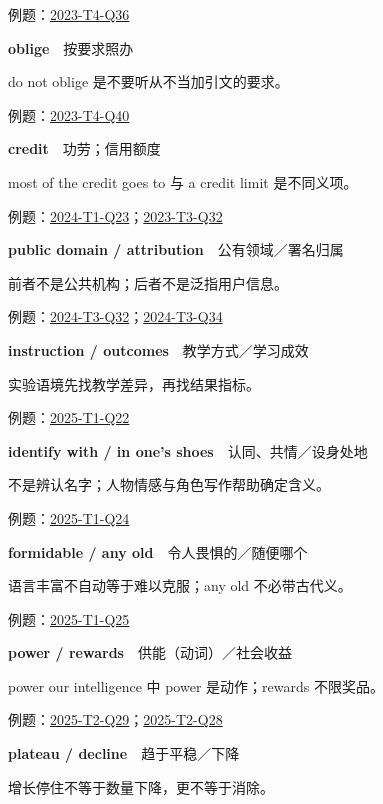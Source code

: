 \documentclass[11pt,a4paper]{article}
\begin{document}
\noindent\small 例题：\hyperref[idx-2023-T4-Q36]{2023-T4-Q36}\normalsize\par\medskip
{}\noindent\textbf{oblige}　按要求照办\par\nopagebreak
do not oblige 是不要听从不当加引文的要求。

\noindent\small 例题：\hyperref[idx-2023-T4-Q40]{2023-T4-Q40}\normalsize\par\medskip
{}\noindent\textbf{credit}　功劳；信用额度\par\nopagebreak
most of the credit goes to 与 a credit limit 是不同义项。

\noindent\small 例题：\hyperref[idx-2024-T1-Q23]{2024-T1-Q23}；\hyperref[idx-2023-T3-Q32]{2023-T3-Q32}\normalsize\par\medskip
{}\noindent\textbf{public domain / attribution}　公有领域／署名归属\par\nopagebreak
前者不是公共机构；后者不是泛指用户信息。

\noindent\small 例题：\hyperref[idx-2024-T3-Q32]{2024-T3-Q32}；\hyperref[idx-2024-T3-Q34]{2024-T3-Q34}\normalsize\par\medskip
{}\noindent\textbf{instruction / outcomes}　教学方式／学习成效\par\nopagebreak
实验语境先找教学差异，再找结果指标。

\noindent\small 例题：\hyperref[idx-2025-T1-Q22]{2025-T1-Q22}\normalsize\par\medskip
{}\noindent\textbf{identify with / in one’s shoes}　认同、共情／设身处地\par\nopagebreak
不是辨认名字；人物情感与角色写作帮助确定含义。

\noindent\small 例题：\hyperref[idx-2025-T1-Q24]{2025-T1-Q24}\normalsize\par\medskip
{}\noindent\textbf{formidable / any old}　令人畏惧的／随便哪个\par\nopagebreak
语言丰富不自动等于难以克服；any old 不必带古代义。

\noindent\small 例题：\hyperref[idx-2025-T1-Q25]{2025-T1-Q25}\normalsize\par\medskip
{}\noindent\textbf{power / rewards}　供能（动词）／社会收益\par\nopagebreak
power our intelligence 中 power 是动作；rewards 不限奖品。

\noindent\small 例题：\hyperref[idx-2025-T2-Q29]{2025-T2-Q29}；\hyperref[idx-2025-T2-Q28]{2025-T2-Q28}\normalsize\par\medskip
{}\noindent\textbf{plateau / decline}　趋于平稳／下降\par\nopagebreak
增长停住不等于数量下降，更不等于消除。
\end{document}

